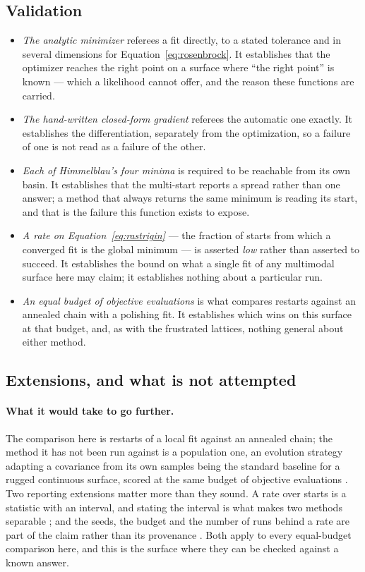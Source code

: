 \documentclass[11pt,a4paper]{article}
\begin{document}
\subsection{Validation}
\label{sec:testfunctions:validation}
\begin{itemize}
  \item \emph{The analytic minimizer} referees a fit directly, to a stated
    tolerance and in several dimensions for Equation~\ref{eq:rosenbrock}. It
    establishes that the optimizer reaches the right point on a surface where
    ``the right point'' is known --- which a likelihood cannot offer, and the
    reason these functions are carried.
  \item \emph{The hand-written closed-form gradient} referees the automatic
    one exactly. It establishes the differentiation, separately from the
    optimization, so a failure of one is not read as a failure of the other.
  \item \emph{Each of Himmelblau's four minima} is required to be reachable
    from its own basin. It establishes that the multi-start reports a spread
    rather than one answer; a method that always returns the same minimum is
    reading its start, and that is the failure this function exists to expose.
  \item \emph{A rate on Equation~\ref{eq:rastrigin}} --- the fraction of
    starts from which a converged fit is the global minimum --- is asserted
    \emph{low} rather than asserted to succeed. It establishes the bound on
    what a single fit of any multimodal surface here may claim; it establishes
    nothing about a particular run.
  \item \emph{An equal budget of objective evaluations} is what compares
    restarts against an annealed chain with a polishing fit. It establishes
    which wins on this surface at that budget, and, as with the frustrated
    lattices, nothing general about either method.
\end{itemize}

\subsection{Extensions, and what is not attempted}
\label{sec:testfunctions:extensions}
\paragraph{What it would take to go further.}
The comparison here is restarts of a local fit against an annealed chain; the
method it has not been run against is a population one, an evolution strategy
adapting a covariance from its own samples being the standard baseline for a
rugged continuous surface, scored at the same budget of objective evaluations
\citep{hansen2001}. Two reporting extensions matter more than they sound. A
rate over starts is a statistic with an interval, and stating the interval is
what makes two methods separable \citep{agarwal2021}; and the seeds, the budget
and the number of runs behind a rate are part of the claim rather than its
provenance \citep{henderson2018}. Both apply to every equal-budget comparison
here, and this is the surface where they can be checked against a known answer.
\end{document}
